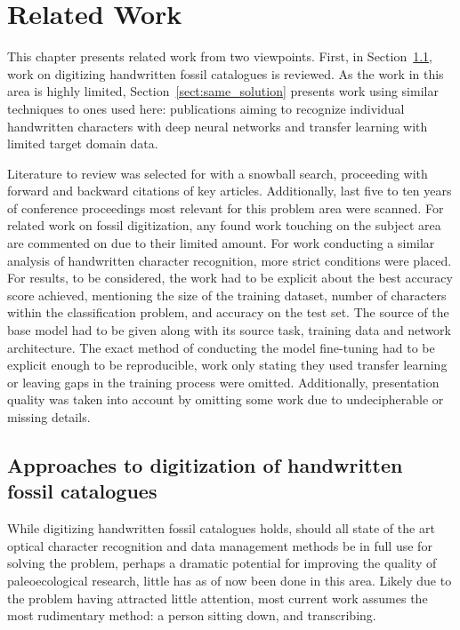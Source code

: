 \documentclass[english,twoside,openright]{UH_DS_MSc}
\begin{document}
\chapter{Related Work}

This chapter presents related work from two viewpoints. First, in Section~\ref{sect:related_same_problem},
work on digitizing handwritten fossil catalogues is reviewed. As the work 
in this area is highly limited, Section~\ref{sect:same_solution} presents work using similar techniques 
to ones used here: publications aiming to recognize individual handwritten characters 
with deep neural networks and transfer learning with limited target domain data.

Literature to review was selected for with a snowball search, proceeding with forward and backward citations 
of key articles. Additionally, last five to ten years of conference proceedings most relevant for this problem area were 
scanned. For related work on fossil digitization, any found work touching on the subject area are commented on due to their 
limited amount. For work conducting a similar analysis of handwritten character recognition, more strict conditions were placed. 
For results, to be considered, the work had to be explicit about the best accuracy score achieved,
mentioning the size of the training dataset, number of characters within the classification problem, and accuracy on the test set.
 The source of the base model had to be given along with its source task, training data
and network architecture. The exact method of conducting the model fine-tuning had to be explicit enough to be reproducible,
work only stating they used transfer learning or leaving gaps in the training process were omitted. Additionally, 
presentation quality was taken into account by omitting some work due to
 undecipherable or missing details.

\section{Approaches to digitization of handwritten fossil catalogues}
\label{sect:related_same_problem}

While digitizing handwritten fossil catalogues holds,
should all state of the art optical character recognition and data management methods 
be in full use for solving the problem, perhaps a dramatic potential for improving 
the quality of paleoecological research, little has as of now been done in this area.
Likely due to the problem having attracted little attention, 
most current work assumes the most rudimentary method: a person sitting down, and transcribing.
\end{document}
